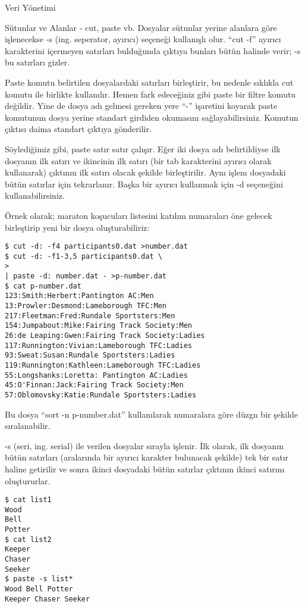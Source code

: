 \begin{section}{Veri Yönetimi}
\begin{subsection}{Sütunlar ve Alanlar - cut, paste vb.}
Dosyalar sütunlar yerine alanlara göre işlenecekse -s (ing. seperator, ayırıcı) seçeneği kullanışlı olur. “cut -f” ayırıcı karakterini içermeyen satırları bulduğunda çıktıya bunları bütün halinde verir; -s bu satırları gizler.

Paste komutu belirtilen dosyalardaki satırları birleştirir, bu nedenle sıklıkla cut komutu ile birlikte kullanılır. Hemen fark edeceğiniz gibi paste bir filtre komutu değildir. Yine de dosya adı gelmesi gereken yere “-” işaretini koyarak paste komutunun dosya yerine standart girdiden okumasını sağlayabilirsiniz. Komutun çıktısı daima standart çıktıya gönderilir.

Söylediğimiz gibi, paste satır satır çalışır. Eğer iki dosya adı belirtildiyse ilk dosyanın ilk satırı ve ikincinin ilk satırı (bir tab karakterini ayırıcı olarak kullanarak) çıktının ilk satırı olacak şekilde birleştirilir. Aynı işlem dosyadaki bütün satırlar için tekrarlanır. Başka bir ayırıcı kullanmak için -d seçeneğini kullanabilirsiniz.

Örnek olarak; maraton koşucuları listesini katılım numaraları öne gelecek birleştirip yeni bir dosya oluşturabiliriz:

\begin{verbatim}
$ cut -d: -f4 participants0.dat >number.dat
$ cut -d: -f1-3,5 participants0.dat \
> 
| paste -d: number.dat - >p-number.dat
$ cat p-number.dat
123:Smith:Herbert:Pantington AC:Men
13:Prowler:Desmond:Lameborough TFC:Men
217:Fleetman:Fred:Rundale Sportsters:Men
154:Jumpabout:Mike:Fairing Track Society:Men
26:de Leaping:Gwen:Fairing Track Society:Ladies
117:Runnington:Vivian:Lameborough TFC:Ladies
93:Sweat:Susan:Rundale Sportsters:Ladies
119:Runnington:Kathleen:Lameborough TFC:Ladies
55:Longshanks:Loretta: Pantington AC:Ladies
45:O'Finnan:Jack:Fairing Track Society:Men
57:Oblomovsky:Katie:Rundale Sportsters:Ladies
\end{verbatim}

Bu dosya “sort -n p-number.dat” kullanılarak numaralara göre düzgn bir şekilde sıralanabilir.

-s (seri, ing. serial) ile verilen dosyalar sırayla işlenir. İlk olarak, ilk dosyanın bütün satırları (aralarında bir ayırıcı karakter bulunacak şekilde) tek bir satır haline getirilir ve sonra ikinci dosyadaki bütün satırlar çıktının ikinci satırını oluştururlar.
\begin{verbatim}
$ cat list1
Wood
Bell
Potter
$ cat list2
Keeper
Chaser
Seeker
$ paste -s list*
Wood Bell Potter
Keeper Chaser Seeker
\end{verbatim}


\end{subsection}
\end{section}
